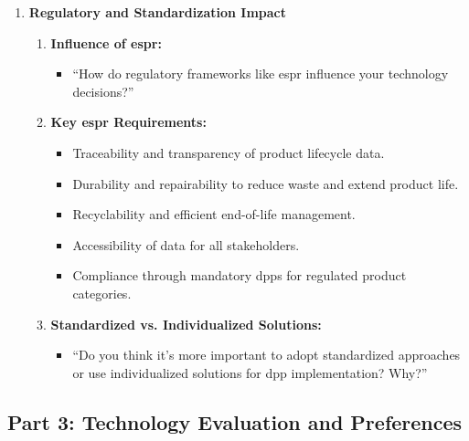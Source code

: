 \begin{enumerate}
    \item \textbf{Regulatory and Standardization Impact}
    \begin{enumerate}
        \item \textbf{Influence of \ac{espr}:}
        \begin{itemize}
            \item ``How do regulatory frameworks like \ac{espr} influence your technology decisions?''
        \end{itemize}
        \item \textbf{Key \ac{espr} Requirements:} 
        \begin{itemize}
            \item Traceability and transparency of product lifecycle data.
            \item Durability and repairability to reduce waste and extend product life.
            \item Recyclability and efficient end-of-life management.
            \item Accessibility of data for all stakeholders.
            \item Compliance through mandatory \ac{dpp}s for regulated product categories.
        \end{itemize}
        \item \textbf{Standardized vs. Individualized Solutions:}
        \begin{itemize}
            \item ``Do you think it’s more important to adopt standardized approaches or use individualized solutions for \ac{dpp} implementation? Why?''
        \end{itemize}
    \end{enumerate}
\end{enumerate}

\subsection*{Part 3: Technology Evaluation and Preferences}

